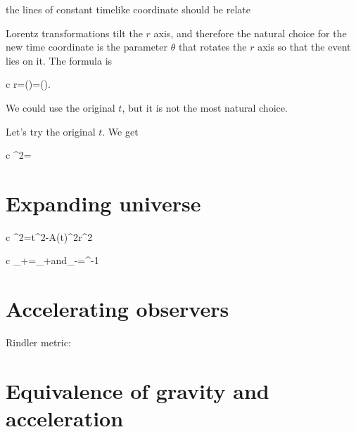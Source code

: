 \documentclass[11pt,oneside%
]{memoir}
\newenvironment{eqna}{\begin{IEEEeqnarray*}{c}}{\end{IEEEeqnarray*}\ignorespacesafterend}
\newcommand{\andd}{\qquad\textrm{and}\qquad}
\newcommand{\dd}{\mathrm{d}}
\DeclareMathOperator{\arctanh}{arctanh}
\begin{document}
the lines of constant timelike coordinate should be relate


Lorentz transformations tilt the \(r\) axis, and therefore the natural choice for the new time coordinate is the parameter \(\theta\) that rotates the \(r\) axis so that the event lies on it. The formula is
\begin{eqna}
r\rightarrow\theta=\arctanh()=\log\left(\right).
\end{eqna}




We could use the original \(t\), but it is not the most natural choice.


Let's try the original \(t\). We get
\begin{eqna}
\dd\tau^2=
\end{eqna}








\section{Expanding universe}

\begin{eqna}
\dd\tau^2=\dd t^2-A(t)^2\dd r^2
\end{eqna}

\begin{eqna}
\sigma_+\rightarrow\tilde{\sigma_+}=\eta\sigma_+\andd\sigma_-\rightarrow\tilde{\sigma_+}=\eta^{-1}\sigma
\end{eqna}

\section{Accelerating observers}

Rindler metric:



\section{Equivalence of gravity and acceleration}








\end{document}
